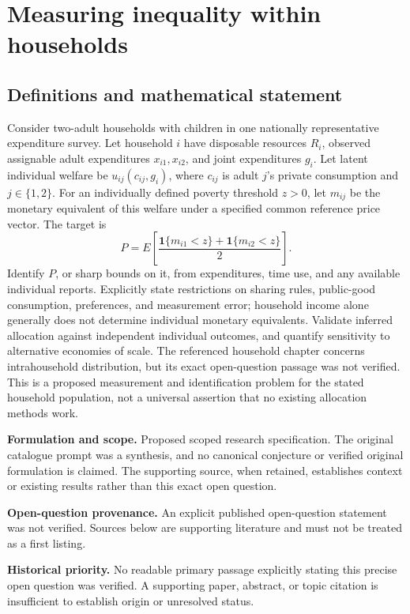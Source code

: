 \documentclass[11pt]{article}
\begin{document}
\section*{Measuring inequality within households}\label{30007740}
\subsection{Definitions and mathematical statement}
Consider two-adult households with children in one nationally representative expenditure survey. Let household \(i\) have disposable resources \(R_i\), observed assignable adult expenditures \(x_{i1},x_{i2}\), and joint expenditures \(g_i\). Let latent individual welfare be \(u_{ij}(c_{ij},g_i)\), where \(c_{ij}\) is adult \(j\)'s private consumption and \(j\in\{1,2\}\). For an individually defined poverty threshold \(z>0\), let \(m_{ij}\) be the monetary equivalent of this welfare under a specified common reference price vector. The target is
\[P=E\!\left[\frac{\mathbf1\{m_{i1}<z\}+\mathbf1\{m_{i2}<z\}}{2}\right].\]
Identify \(P\), or sharp bounds on it, from expenditures, time use, and any available individual reports. Explicitly state restrictions on sharing rules, public-good consumption, preferences, and measurement error; household income alone generally does not determine individual monetary equivalents. Validate inferred allocation against independent individual outcomes, and quantify sensitivity to alternative economies of scale. The referenced household chapter concerns intrahousehold distribution, but its exact open-question passage was not verified. This is a proposed measurement and identification problem for the stated household population, not a universal assertion that no existing allocation methods work.

\par\textbf{Formulation and scope.} Proposed scoped research specification. The original catalogue prompt was a synthesis, and no canonical conjecture or verified original formulation is claimed. The supporting source, when retained, establishes context or existing results rather than this exact open question.

\par\textbf{Open-question provenance.} An explicit published open-question statement was not verified. Sources below are supporting literature and must not be treated as a first listing.

\par\textbf{Historical priority.} No readable primary passage explicitly stating this precise open question was verified. A supporting paper, abstract, or topic citation is insufficient to establish origin or unresolved status.
\end{document}
